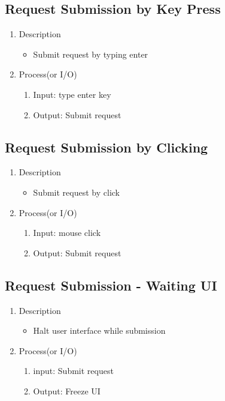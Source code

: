 \documentclass[conference]{IEEEtran}
\begin{document}
\begin{itemize}
\begin{itemize}
\begin{itemize}
\begin{itemize}
\subsection{Request Submission by Key Press}
\begin{enumerate}
\item Description
\begin{itemize}
  \item Submit request by typing enter 
\end{itemize}
\item Process(or I/O)
  \begin{enumerate}
  \item Input: type enter key
  \item Output: Submit request
  \end{enumerate}
\end{enumerate}
\textit{}

\subsection{Request Submission by Clicking}
\begin{enumerate}
\item Description
\begin{itemize}
  \item Submit request by click 
\end{itemize}
\item Process(or I/O)
  \begin{enumerate}
     \item Input: mouse click
    \item Output: Submit request
  \end{enumerate}
\end{enumerate}
\textit{}

\subsection{Request Submission - Waiting UI}
\begin{enumerate}
\item Description
\begin{itemize}
  \item Halt user interface while submission 
\end{itemize}
\item Process(or I/O)
  \begin{enumerate}
     \item input: Submit request 
     \item Output: Freeze UI
  \end{enumerate}
\end{enumerate}
\textit{}


\end{itemize}
\end{itemize}
\end{itemize}
\end{itemize}
\end{document}
